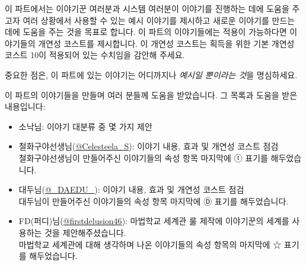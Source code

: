 \documentclass{report}
\begin{document}
	이 파트에서는 이야기꾼 여러분과 시스템 여러분이 이야기를 진행하는 데에 도움을 주고자 여러 상황에서 사용할 수 있는 예시 이야기를 제시하고 새로운 이야기를 만드는 데에 도움을 주는 것을 목표로 합니다. 이 파트의 이야기들에는 적용이 가능하다면 이야기들의 개연성 코스트를 제시합니다. 이 개연성 코스트는 획득을 위한 기본 개연성 코스트 10이 적용되어 있는 수치임을 감안해 주세요.
	
	중요한 점은, 이 파트에 있는 이야기는 어디까지나 \emph{예시일 뿐이라는 것}을 명심하세요.
	
	이 파트의 이야기들을 만들며 여러 분들께 도움을 받았습니다. 그 목록과 도움을 받은 내용입니다:
	\begin{itemize}
		\item 소낙님: 이야기 대분류 중 몇 가지 제안
		
		\item 철화구야선생님(\href{https://twitter.com/Celesteela_S}{@Celesteela\_S}): 이야기 내용, 효과 및 개연성 코스트 점검\\
		철화구야선생님이 만들어주신 이야기들의 속성 항목 마지막에 ⓣ 표기를 해두었습니다.
		
		\item 대두님(\href{https://twitter.com/_DAEDU_}{@\_DAEDU\_}): 이야기 내용, 효과 및 개연성 코스트 점검\\
		대두님이 만들어주신 이야기들의 속성 항목 마지막에 Ⓓ  표기를 해두었습니다.
		
		\item FD(퍼디)님(\href{https://twitter.com/firstdelusion46}{@firstdelusion46}): 마법학교 세계관 룰 제작에 이야기꾼의 세계를 사용하는 것을 제안해주셨습니다.\\
		마법학교 세계관에 대해 생각하며 나온 이야기들의 속성 항목의 마지막에 ☆ 표기를 해두었습니다.
	\end{itemize}
\end{document}
